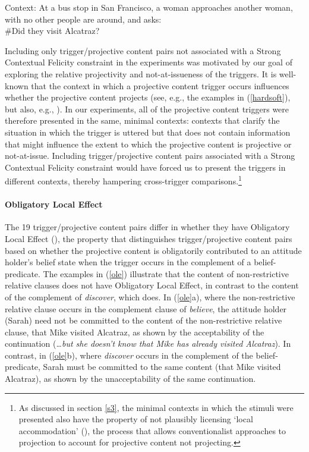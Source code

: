 \documentclass[11pt,fleqn]{article}
\newcommand{\6}{\mbox{$[\hspace*{-.6mm}[$}}
\newcommand{\9}{\mbox{$]\hspace*{-.6mm}]$}}
\begin{document}
\begin{exe}
\ex\label{scf} Context: At a bus stop in San Francisco, a woman approaches another woman, with no other people are around, and asks: \\ \#Did they visit Alcatraz?
\end{exe}

Including only trigger/projective content pairs not associated with a Strong Contextual Felicity constraint in the experiments was motivated by our goal of exploring the relative projectivity and not-at-issueness of the triggers. It is well-known that the context in which a projective content trigger occurs influences whether the projective content projects (see, e.g., the examples in (\ref{hardsoft}), but also, e.g., \citealt{simons01,beaver-belly}). In our experiments, all of the projective content triggers were therefore presented in the same, minimal contexts: contexts that clarify the situation in which the trigger is uttered but that does not contain information that might influence the extent to which the projective content is projective or not-at-issue. Including trigger/projective content pairs associated with a Strong Contextual Felicity constraint would have forced us to present the triggers in different contexts, thereby hampering cross-trigger comparisons.\footnote{As discussed in section \ref{s3}, the minimal contexts in which the stimuli were presented also have the property of not plausibly licensing `local accommodation' (\citealt{heim83,vds92}), the process that allows conventionalist approaches to projection to account for projective content not projecting.}

\paragraph{Obligatory Local Effect} The 19 trigger/projective content pairs differ in whether they have Obligatory Local Effect (\citealt{brst-lang11}), the property that distinguishes trigger/projective content pairs based on whether the projective content is obligatorily contributed to an attitude holder's belief state when the trigger occurs in the complement of a belief-predicate. The examples in (\ref{ole}) illustrate that the content of non-restrictive relative clauses does not have Obligatory Local Effect, in contrast to the content of the complement of {\em discover}, which does. In (\ref{ole}a), where the non-restrictive relative clause occurs in the complement clause of {\em believe}, the attitude holder (Sarah) need not be committed to the content of the non-restrictive relative clause, that Mike visited Alcatraz, as shown by the acceptability of the continuation ({\em \ldots but she doesn't know that Mike has already visited Alcatraz}). In contrast, in (\ref{ole}b), where {\em discover} occurs in the complement of the belief-predicate, Sarah must be committed to the same content (that Mike visited Alcatraz), as shown by the unacceptability of the same continuation. 
\end{document}
